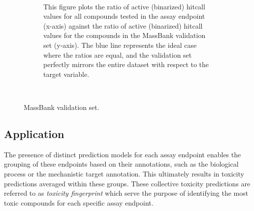 \begin{enumerate}
\begin{figure}
\begin{subfigure}[b]{0.48\textwidth}
            \caption{This figure plots the ratio of active (binarized) hitcall values for all compounds tested in the assay endpoint (x-axis) against the ratio of active (binarized) hitcall values for the compounds in the MassBank validation set (y-axis). The blue line represents the ideal case where the ratios are equal, and the validation set perfectly mirrors the entire dataset with respect to the target variable.}
            ~\label{fig:activity_ratio_comparison}
        \end{subfigure}
        \caption{MassBank validation set.}
        ~\label{fig:Massbank_validation}
    \end{figure}
\end{enumerate}


\subsection{Application}
The presence of distinct prediction models for each assay endpoint enables the grouping of these endpoints based on their annotations, such as the biological process or the mechanistic target annotation. This ultimately results in toxicity predictions averaged within these groups. These collective toxicity predictions are referred to as \emph{toxicity fingerprint} which serve the purpose of identifying the most toxic compounds for each specific assay endpoint.


